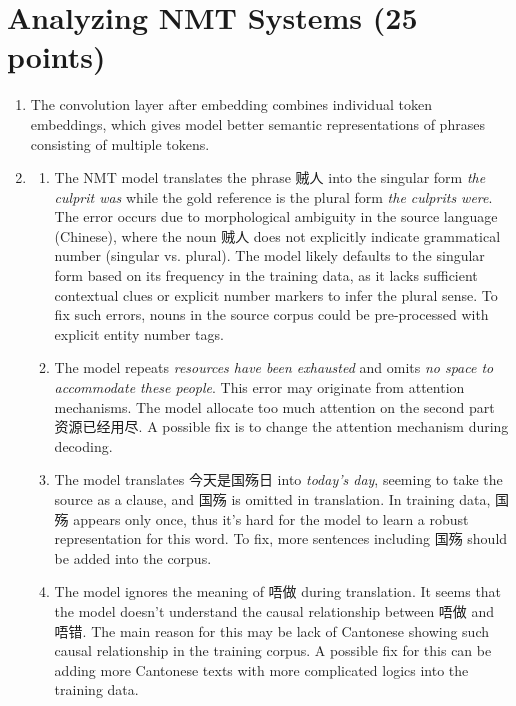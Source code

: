 \documentclass[11pt, a4paper, oneside]{article}
\begin{document}
\section{Analyzing NMT Systems (25 points)}
\begin{enumerate}[label=(\alph*), left=0pt, labelsep=1em, itemsep=1em]
    \item The convolution layer after embedding combines individual token embeddings, 
    which gives model better semantic representations of phrases consisting of multiple tokens.
    \item \begin{enumerate}[label=\roman*., left=0pt, labelsep=1em, itemsep=1em]
    \item The NMT model translates the phrase 贼人 into the singular form \textit{the 
    culprit was} while the gold reference is the plural form \textit{the culprits were}. 
    The error occurs due to morphological ambiguity in the source language (Chinese), 
    where the noun 贼人 does not explicitly indicate grammatical number (singular vs. plural). 
    The model likely defaults to the singular form based on its frequency in the training data, 
    as it lacks sufficient contextual clues or explicit number markers to infer the plural sense.
    To fix such errors, nouns in the source corpus could be pre-processed with explicit entity 
    number tags.
    \item The model repeats \textit{resources have been exhausted} and omits 
    \textit{no space to accommodate these people}. This error may originate from 
    attention mechanisms. The model allocate too much attention on the second part
    资源已经用尽. A possible fix is to change the attention mechanism during decoding.
    \item The model translates 今天是国殇日 into \textit{today's day}, seeming to take
    the source as a clause, and 国殇 is omitted in translation. In training data, 国殇
    appears only once, thus it's hard for the model to learn a robust representation for
    this word. To fix, more sentences including 国殇 should be added into the corpus.
    \item The model ignores the meaning of 唔做 during translation. It seems that the
    model doesn't understand the causal relationship between 唔做 and 唔错. The main reason for
    this may be lack of Cantonese showing such causal relationship in the training corpus. A 
    possible fix for this can be adding more Cantonese texts with more complicated logics into
    the training data.
    \end{enumerate}
\end{enumerate}
\end{document}
